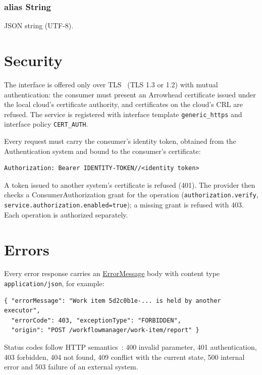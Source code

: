 \documentclass[a4paper]{arrowhead}
\newcommand{\mref}[1]{{\textcolor{ArrowheadPurple}{\hyperref[sec:model:#1]{#1}}}}
\newcommand{\pdef}[1]{{\textcolor{ArrowheadGrey}{#1\label{sec:model:primitives:#1}\label{sec:model:primitives:#1s}}}}
\begin{document}
\subsubsection*{alias \pdef{String}}
JSON string (UTF-8).



\section{Security}
\label{sec:security}
The interface is offered only over TLS~\cite{rfc8446} (TLS 1.3 or 1.2) with mutual authentication: the consumer must
present an Arrowhead certificate issued under the local cloud's certificate authority, and certificates on the
cloud's CRL are refused. The service is registered with interface template \texttt{generic\_\allowbreak{}https} and interface
policy \texttt{CERT\_AUTH}.

Every request must carry the consumer's identity token, obtained from the Authentication system and bound to the
consumer's certificate:
\begin{lstlisting}
Authorization: Bearer IDENTITY-TOKEN//<identity token>
\end{lstlisting}
A token issued to another system's certificate is refused (401). The provider then checks a ConsumerAuthorization
grant for the operation (\texttt{authorization.\allowbreak{}verify}, \texttt{service.\allowbreak{}authorization.\allowbreak{}enabled=\allowbreak{}true}); a missing grant is
refused with 403. Each operation is authorized separately.


\section{Errors}
\label{sec:errors}
Every error response carries an \mref{ErrorMessage} body with content type \texttt{application/\allowbreak{}json}, for example:
\begin{lstlisting}
{ "errorMessage": "Work item 5d2c0b1e-... is held by another executor",
  "errorCode": 403, "exceptionType": "FORBIDDEN",
  "origin": "POST /workflowmanager/work-item/report" }
\end{lstlisting}
Status codes follow HTTP semantics~\cite{rfc9110}: 400 invalid parameter, 401 authentication, 403 forbidden, 404 not
found, 409 conflict with the current state, 500 internal error and 503 failure of an external system.
\end{document}
